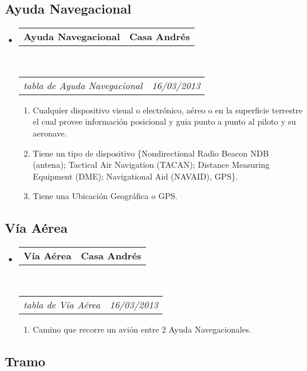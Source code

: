 \documentclass[10pt,letterpaper]{article}
\makeatletter
\newcommand{\headerrow}[2]
{\begin{tabular*}{\linewidth}{l@{\extracolsep{\fill}}r}
	#1 &
	#2 \\
\end{tabular*}}
\makeatother
\begin{document}
\subsection*{Ayuda Navegacional}

\begin{itemize}
	\parskip=0.1em

	\item
	\headerrow
		{\textbf{Ayuda Navegacional}}
		{\textbf{Casa Andrés}}
	\\
	\headerrow
		{\emph{tabla de Ayuda Navegacional}}
		{\emph{16/03/2013}}
	\begin{enumerate}
		\item Cualquier dispositivo visual o electrónico, aéreo o en la superficie terrestre el cual provee información posicional y guia punto a punto al piloto y su aeronave.
		\item Tiene un tipo de dispositivo \{Nondirectional Radio Beacon NDB (antena); Tactical Air Navigation (TACAN); Distance Measuring Equipment (DME); Navigational Aid (NAVAID), GPS\}.
		\item Tiene una Ubicación Geográfica o GPS.
		
	\end{enumerate}

\end{itemize}

\subsection*{Vía Aérea}

\begin{itemize}
	\parskip=0.1em

	\item
	\headerrow
		{\textbf{Vía Aérea}}
		{\textbf{Casa Andrés}}
	\\
	\headerrow
		{\emph{tabla de Vía Aérea}}
		{\emph{16/03/2013}}
	\begin{enumerate}
		\item Camino que recorre un avión entre 2 Ayuda Navegacionales.
		
	\end{enumerate}

\end{itemize}

\subsection*{Tramo}
\end{document}
